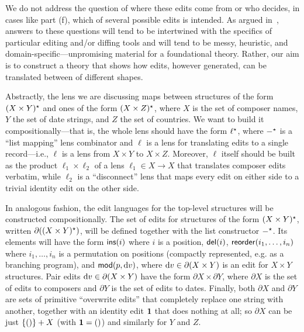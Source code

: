 We do not address the question of where these edits come from or who
decides, in cases like part (f), which of several possible edits is
intended.  As argued in~\cite{Matching10}, answers to these questions will
tend to be intertwined with the specifics of particular editing and/or
diffing tools and will tend to be messy, heuristic, and
domain-specific---unpromising material for a foundational theory.  Rather,
our aim is to construct a theory that shows how edits, however
generated, can be translated between \replicas of different shapes.

\iflater{}\fi

Abstractly, the lens we are discussing maps between structures of the form
$(X \times Y)^\star$ and ones of the form $(X \times Z)^\star$, where $X$ is the set
of composer names, $Y$ the set of date strings, and $Z$ the set of
countries.  We want to build it compositionally---that is, the whole lens
should have the form $\ell^\star$, where $-^\star$ is a ``list mapping'' lens
combinator and $\ell$ is a lens for translating edits to a
single record---i.e., $\ell$ is a lens from $X \times Y$ to $X \times Z$.
Moreover, $\ell$ itself should be built as the product $\ell_1 \times
\ell_2$ of a lens $\ell_1 \in X \to X$ that translates composer edits
verbatim, while $\ell_2$ is a ``disconnect'' lens that maps every edit on
either side to a trivial identity edit on the other side.

In analogous fashion, the edit languages for the top-level structures will
be constructed compositionally.  The set of edits for structures of the form
$(X \times Y)^\star$, written $\partial ((X \times Y)^\star)$, will be defined
together with the list constructor $-^\star$.  Its elements will have the form
$\mathsf{ins}(i)$ where $i$ is a position, $\mathsf{del}(i)$,
$\mathsf{reorder}(i_1,\ldots,i_n)$ where $i_1,\ldots,i_n$ is a permutation on
positions (compactly represented, e.g. as a branching program),
\iflater{}\fi and $\mathsf{mod}(p,\textrm{d} v)$, where $\textrm{d} v \in
\partial (X\times Y)$ is an edit for $X \times Y$ structures.  Pair edits
$\textrm{d} v \in \partial (X \times Y)$ have the form $\partial X \times
\partial Y$, where $\partial X$ is the set of edits to composers and
$\partial Y$ is the set of edits to dates.  Finally, both $\partial
X$ and $\partial Y$ are sets of primitive ``overwrite edits'' that completely
replace one string with another, together with an identity edit $\mbox{\bf{1}}$
that does nothing at all; so $\partial X$ can be just $\{{()}\} + X$ (with
$\mbox{\bf{1}} = {()}$) and similarly for $Y$ and $Z$.

